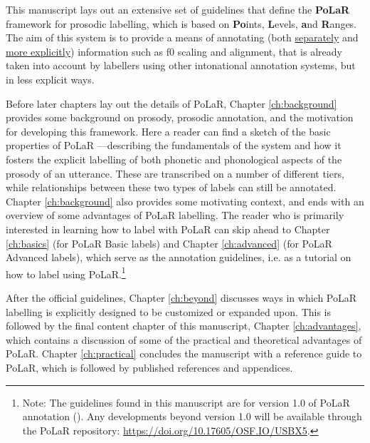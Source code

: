\addchap{\lsPrefaceTitle} 

This manuscript lays out an extensive set of guidelines that define the \textbf{PoLaR} framework for prosodic labelling, which is based on \textbf{Po}ints, \textbf{L}evels, \textbf{a}nd \textbf{R}anges.  The aim of this system is to provide a means of annotating (both \uline{separately} and \uline{more explicitly}) information such as f0 scaling and alignment, that is already taken into account by labellers using other intonational annotation systems, but in less explicit ways.

Before later chapters lay out the details of PoLaR, Chapter \ref{ch:background} provides some background on prosody, prosodic annotation, and the motivation for developing this framework. Here a reader can find a sketch of the basic properties of PoLaR —describing the fundamentals of the system and how it fosters the explicit labelling of both phonetic and phonological aspects of the prosody of an utterance.  These are transcribed on a number of different tiers, while relationships between these two types of labels can still be annotated. Chapter \ref{ch:background} also provides some motivating context, and ends with an overview of some advantages of PoLaR labelling. The reader who is primarily interested in learning how to label with PoLaR can skip ahead to Chapter \ref{ch:basics} (for PoLaR Basic labels) and Chapter \ref{ch:advanced} (for PoLaR Advanced labels), which serve as the annotation guidelines, i.e. as a tutorial on how to label using PoLaR.\footnote{Note: The guidelines found in this manuscript are for version 1.0 of PoLaR annotation (\citealt{ahn-21}). Any developments beyond version 1.0 will be available through the PoLaR repository: \href{https://doi.org/10.17605/OSF.IO/USBX5}{https://doi.org/10.17605/OSF.IO/USBX5}.}

After the official guidelines, Chapter \ref{ch:beyond} discusses ways in which PoLaR labelling is explicitly designed to be customized or expanded upon. This is followed by the final content chapter of this manuscript, Chapter \ref{ch:advantages}, which contains a discussion of some of the practical and theoretical advantages of PoLaR. Chapter \ref{ch:practical} concludes the manuscript with a reference guide to PoLaR, which is followed by published references and appendices.